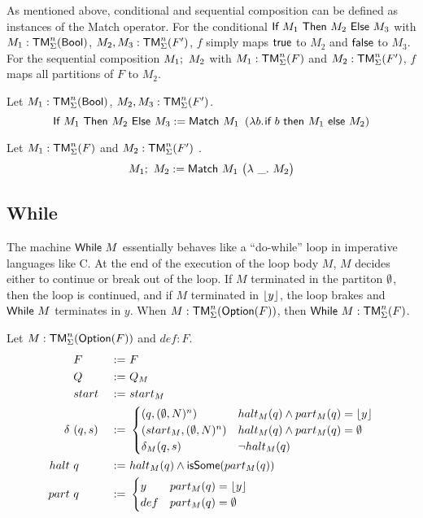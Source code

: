As mentioned above, conditional and sequential composition can be defined as instances of the Match operator.  For the conditional
$\textsf{If}~M_1~\textsf{Then}~M_2~\textsf{Else}~M_3$ with $M_1 : \textsf{TM}_\Sigma^n(\textsf{Bool})$, $M_2, M_3 : \textsf{TM}_\Sigma^n(F')$, $f$ simply maps $\textsf{true}$ to $M_2$ and $\textsf{false}$ to $M_3$.  For the
sequential composition $M_1 ;~ M_2$ with $M_1 : \textsf{TM}_\Sigma^n(F)$ and $M_2 : \textsf{TM}_\Sigma^n(F')$, $f$ maps all partitions of $F$ to $M_2$.

\begin{definition}[Conditional]
  \label{def:If}
  Let $M_1 : \textsf{TM}_\Sigma^n(\textsf{Bool})$, $M_2, M_3 : \textsf{TM}_\Sigma^n(F')$.
  \[
    \textsf{If}~M_1~\textsf{Then}~M_2~\textsf{Else}~M_3 := \textsf{Match}~M_1~
    \left(\lambda b{.}\hskip.7pt\textsf{if}~b~\textsf{then}~M_1~\textsf{else}~M_2 \right)
  \]
\end{definition}

\begin{definition}
  Let $M_1 : \textsf{TM}_\Sigma^n(F)$ and $M_2 : \textsf{TM}_\Sigma^n(F')$ .
  \[
    M_1 ;~ M_2 := \textsf{Match}~M_1~
    \bigl(
    \lambda~\_.~M_2
    \bigr)
  \]
\end{definition}



\subsection{While}
\label{sec:While}


The machine $\textsf{While}~ M$ essentially behaves like a ``do-while'' loop in imperative languages like C.  At the end of the execution of the loop body $M$,
$M$ decides either to continue or break out of the loop.  If $M$ terminated in the partiton $\emptyset$, then the loop is continued, and if $M$ terminated
in $\left\lfloor {y} \right\rfloor$, the loop brakes and $\textsf{While}~ M$ terminates in $y$.  When $M : \textsf{TM}_\Sigma^n(\textsf{Option}(F))$, then $\textsf{While}~ M : \textsf{TM}_\Sigma^n(F)$.


\begin{definition}[$\MS{While}~M$]
  \label{def:While}
  Let $M : \textsf{TM}_\Sigma^n(\textsf{Option}(F))$ and $def:F$.
  \begin{alignat*}{3}
    & F              &~:=~& F \\
    & Q              &~:=~& Q_M \\
    & start          &~:=~& start_M \\
    \delta ~& (q, s) &~:=~&
    \begin{cases}
      (q,       (\emptyset, N)^n) & halt_M(q) \land part_M(q) = \left\lfloor {y} \right\rfloor \\
      (start_M, (\emptyset, N)^n) & halt_M(q) \land part_M(q) = \emptyset \\
      \delta_M (q,s)    & \lnot halt_M(q)
    \end{cases} \\
    halt ~& q      &~:=~& halt_M(q) \land \textsf{isSome}(part_M(q)) \\
    part ~& q      &~:=~&
    \begin{cases}
      y   & part_M(q) = \left\lfloor {y} \right\rfloor \\
      def & part_M(q) = \emptyset
    \end{cases}
  \end{alignat*}
\end{definition}

